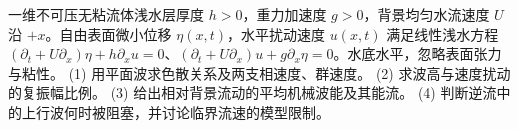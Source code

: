 一维不可压无粘流体浅水层厚度 \(h>0\)，重力加速度 \(g>0\)，背景均匀水流速度 \(U\) 沿 \(+x\)。自由表面微小位移 \(\eta(x,t)\)，水平扰动速度 \(u(x,t)\) 满足线性浅水方程 \((\partial_t+U\partial_x)\eta+h\partial_xu=0\)、\((\partial_t+U\partial_x)u+g\partial_x\eta=0\)。水底水平，忽略表面张力与粘性。
(1) 用平面波求色散关系及两支相速度、群速度。
(2) 求波高与速度扰动的复振幅比例。
(3) 给出相对背景流动的平均机械波能及其能流。
(4) 判断逆流中的上行波何时被阻塞，并讨论临界流速的模型限制。
